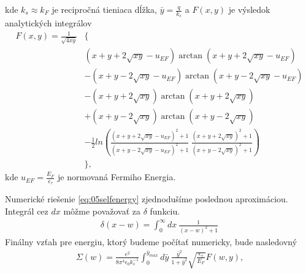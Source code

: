 kde $k_s\approx k_F$ je recipročná tieniaca dĺžka, $\bar{y}=\frac{q}{k_s}$  a $F(x,y)$ je výsledok analytických integrálov
\begin{align*}
F(x,y)=\frac{1}{\sqrt{4xy}}&\{ \\
&(x+y+2\sqrt{xy}-u_{EF})\arctan(x+y+2\sqrt{xy}-u_{EF}) \\
&-(x+y-2\sqrt{xy}-u_{EF})\arctan(x+y-2\sqrt{xy}-u_{EF}) \\
&-(x+y+2\sqrt{xy})\arctan(x+y+2\sqrt{xy}) \\
&+(x+y-2\sqrt{xy})\arctan(x+y-2\sqrt{xy}) \\
&-\frac{1}{2}ln(\frac{(x+y+2\sqrt{xy}-u_{EF})^2+1}{(x+y-2\sqrt{xy}-u_{EF})^2+1}\ \frac{(x+y+2\sqrt{xy})^2+1}{(x+y-2\sqrt{xy})^2+1})\\
&\}\text{,}
\end{align*}
kde $u_{EF}=\frac{E_F}{\epsilon_\tau}$ je normovaná Fermiho Energia.

Numerické riešenie \eqref{eq:05selfenergy} zjednodušíme poslednou aproximáciou. Integrál cez $dx$ môžme považovať za $\delta$ funkciu.
\begin{align}
\delta(x-w)=\int_0^{\infty}dx\ \frac{1}{(x-w)^2+1}
\end{align}
Finálny vzťah pre energiu, ktorý budeme počítať numericky, bude nasledovný
\begin{align}
\label{eq:05selfenergy2}
\Sigma(w)=\frac{e^2}{8\pi^4\epsilon_0 k_s^{-1}} \int_0^{\bar y_{max}} d\bar{y}\ \frac{\bar{y}^2}{1+\bar{y}^2}\sqrt{\frac{\epsilon_\tau}{E_F}}F(w,y) \text{,}
\end{align} 

